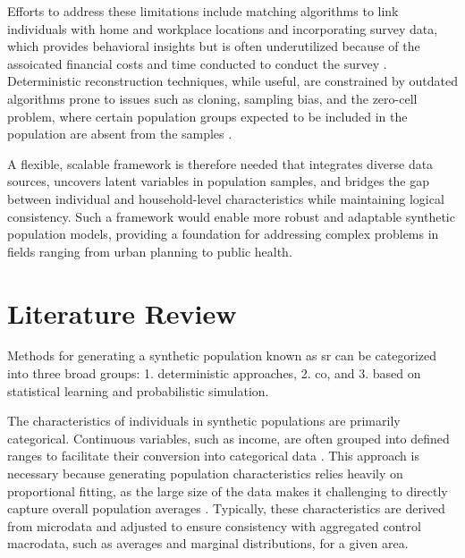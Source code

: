 ﻿\documentclass[../main.tex]{subfiles}
\begin{document}
Efforts to address these limitations include matching algorithms to link individuals with home and workplace locations \citep{Djellab2020ImprovingInformation} and incorporating survey data, which provides behavioral insights but is often underutilized because of the assoicated financial costs and time conducted to conduct the survey \citep{Namazi-Rad2017AnSurveydata, Hawkins2023ASynthesis}. Deterministic reconstruction techniques, while useful, are constrained by outdated algorithms prone to issues such as cloning, sampling bias, and the zero-cell problem, where certain population groups expected to be included in the population are absent from the samples \citep{Acharya2022GenSyn:Sources}.

A flexible, scalable framework is therefore needed that integrates diverse data sources, uncovers latent variables in population samples, and bridges the gap between individual and household-level characteristics while maintaining logical consistency. Such a framework would enable more robust and adaptable synthetic population models, providing a foundation for addressing complex problems in fields ranging from urban planning to public health.

\section{Literature Review}
Methods for generating a synthetic population known as \gls{sr} can be categorized into three broad groups: 1. deterministic approaches, 2. \gls{co}, and 3. based on statistical learning and probabilistic simulation.

The characteristics of individuals in synthetic populations are primarily categorical. Continuous variables, such as income, are often grouped into defined ranges to facilitate their conversion into categorical data \citep{Borysov2019HowSynthesis}. This approach is necessary because generating population characteristics relies heavily on proportional fitting, as the large size of the data makes it challenging to directly capture overall population averages \citep{Wu2018GeneratingDatasets}. Typically, these characteristics are derived from microdata and adjusted to ensure consistency with aggregated control macrodata, such as averages and marginal distributions, for a given area.
\end{document}
